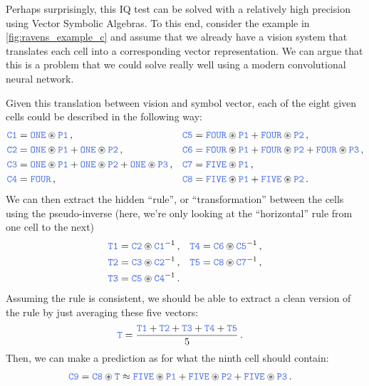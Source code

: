 \documentclass[10pt,letterpaper,oneside]{article}
\begin{document}
Perhaps surprisingly, this IQ test can be solved with a relatively high precision using Vector Symbolic Algebras. To this end, consider the example in \cref{fig:ravens_example_c} and assume that we already have a vision system that translates each cell into a corresponding vector representation. We can argue that this is a problem that we could solve really well using a modern convolutional neural network.

Given this translation between vision and symbol vector, each of the eight given cells could be described in the following way:
\begin{align*}
	\Obj{C1} &= \Obj{ONE}  \CC \Obj{P1}                                                       \,, &
	\Obj{C5} &= \Obj{FOUR} \CC \Obj{P1} + \Obj{FOUR} \CC \Obj{P2}                             \,, \\
	\Obj{C2} &= \Obj{ONE}  \CC \Obj{P1} + \Obj{ONE}  \CC \Obj{P2}                             \,, &
	\Obj{C6} &= \Obj{FOUR} \CC \Obj{P1} + \Obj{FOUR} \CC \Obj{P2} + \Obj{FOUR} \CC \Obj{P3}   \,, \\
	\Obj{C3} &= \Obj{ONE}  \CC \Obj{P1} + \Obj{ONE}  \CC \Obj{P2} + \Obj{ONE}  \CC \Obj{P3}   \,, &
	\Obj{C7} &= \Obj{FIVE} \CC \Obj{P1}                                                       \,, \\
	\Obj{C4} &= \Obj{FOUR}   \,, &
	\Obj{C8} &= \Obj{FIVE} \CC \Obj{P1} + \Obj{FIVE} \CC \Obj{P2}                             \,.
\end{align*}
We can then extract the hidden \enquote{rule}, or \enquote{transformation} between the cells using the pseudo-inverse (here, we're only looking at the \enquote{horizontal} rule from one cell to the next)
\begin{align*}
	\Obj{T1} &= \Obj{C2} \CC \Obj{C1}^{-1} \,, &
	\Obj{T4} &= \Obj{C6} \CC \Obj{C5}^{-1} \,, \\
	\Obj{T2} &= \Obj{C3} \CC \Obj{C2}^{-1} \,, &
	\Obj{T5} &= \Obj{C8} \CC \Obj{C7}^{-1} \,, \\
	\Obj{T3} &= \Obj{C5} \CC \Obj{C4}^{-1} \,.
\end{align*}
Assuming the rule is consistent, we should be able to extract a clean version of the rule by just averaging these five vectors:
\begin{align*}
	\Obj{T} &= \frac{\Obj{T1} + \Obj{T2} + \Obj{T3} + \Obj{T4} + \Obj{T5}}5 \,.
\end{align*}
Then, we can make a prediction as for what the ninth cell should contain:
\begin{align*}
	\Obj{C9} &= \Obj{C8} \CC \Obj{T} \approx \Obj{FIVE}  \CC \Obj{P1} + \Obj{FIVE}  \CC \Obj{P2} + \Obj{FIVE}  \CC \Obj{P3} \,.
\end{align*}
\pagebreak
{}
\end{document}

